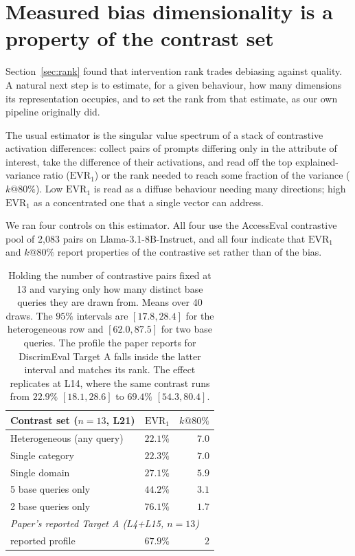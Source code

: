 \section{Measured bias dimensionality is a property of the contrast set}
\label{sec:geometry}

Section~\ref{sec:rank} found that intervention rank trades debiasing against quality. A
natural next step is to estimate, for a given behaviour, how many dimensions its
representation occupies, and to set the rank from that estimate, as our own pipeline
originally did.

The usual estimator is the singular value spectrum of a stack of contrastive
activation differences: collect pairs of prompts differing only in the
attribute of interest, take the difference of their activations, and read off
the top explained-variance ratio ($\mathrm{EVR}_1$) or the rank needed to
reach some fraction of the variance ($k@80\%$). Low $\mathrm{EVR}_1$ is read
as a diffuse behaviour needing many directions; high $\mathrm{EVR}_1$ as a
concentrated one that a single vector can address.

We ran four controls on this estimator. All four use the AccessEval
contrastive pool of 2{,}083 pairs on Llama-3.1-8B-Instruct, and all four
indicate that $\mathrm{EVR}_1$ and $k@80\%$ report properties of the
contrastive set rather than of the bias.

\begin{table}[t]
\centering
\small
\begin{tabular}{lrr}
\toprule
Contrast set ($n{=}13$, L21) & $\mathrm{EVR}_1$ & $k@80\%$ \\
\midrule
Heterogeneous (any query)      & $22.1\%$ & $7.0$ \\
Single category                & $22.3\%$ & $7.0$ \\
Single domain                  & $27.1\%$ & $5.9$ \\
5 base queries only            & $44.2\%$ & $3.1$ \\
2 base queries only            & $\mathbf{76.1\%}$ & $\mathbf{1.7}$ \\
\midrule
\multicolumn{3}{l}{\textit{Paper's reported Target A (L4+L15, $n{=}13$)}} \\
\quad reported profile         & $67.9\%$ & $2$ \\
\bottomrule
\end{tabular}
\caption{Holding the number of contrastive pairs fixed at 13 and varying only how many
distinct base queries they are drawn from. Means over 40 draws. The $95\%$ intervals are
$[17.8, 28.4]$ for the heterogeneous row and $[62.0, 87.5]$ for two base queries. The
profile the paper reports for DiscrimEval Target A falls inside the latter interval and
matches its rank. The effect replicates at L14, where the same contrast runs from
$22.9\%$ $[18.1, 28.6]$ to $69.4\%$ $[54.3, 80.4]$.}
\label{tab:homogeneity}
\end{table}

